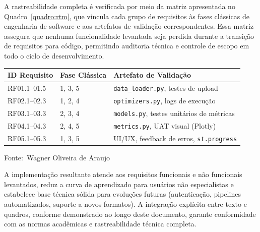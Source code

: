 \documentclass[12pt,a4paper]{article}
\newcommand{\oautor}{Wagner Oliveira de Araujo}
\begin{document}
A rastreabilidade completa é verificada por meio da matriz apresentada no Quadro~\ref{quadro:rtm}, que vincula cada grupo de requisitos às fases clássicas de engenharia de software e aos artefatos de validação correspondentes. Essa matriz assegura que nenhuma funcionalidade levantada seja perdida durante a transição de requisitos para código, permitindo auditoria técnica e controle de escopo em todo o ciclo de desenvolvimento.

\begin{quadro}[ht]
\centering
\small
\caption{Matriz de rastreabilidade de requisitos (\textit{Requirements Traceability Matrix} - RTM)}
\label{quadro:rtm}
\begin{threeparttable}
\begin{tabularx}{\textwidth}{|l|l|X|} \hline
\textbf{ID Requisito} & \textbf{Fase Clássica} & \textbf{Artefato de Validação} \\ \hline
RF01.1--01.5 & 1, 3, 5 & \texttt{data\_loader.py}, testes de upload \\ \hline
RF02.1--02.3 & 1, 2, 4 & \texttt{optimizers.py}, logs de execução \\ \hline
RF03.1--03.3 & 2, 3, 4 & \texttt{models.py}, testes unitários de métricas \\ \hline
RF04.1--04.3 & 2, 4, 5 & \texttt{metrics.py}, UAT visual (Plotly) \\ \hline
RF05.1--05.3 & 1, 3, 5 & UI/UX, feedback de erros, \texttt{st.progress} \\ \hline
\end{tabularx}
\begin{tablenotes}[flushleft]
\footnotesize
\item Fonte:~\oautor
\end{tablenotes}
\end{threeparttable}
\end{quadro}

A implementação resultante atende aos requisitos funcionais e não funcionais levantados, reduz a curva de aprendizado para usuários não especialistas e estabelece base técnica sólida para evoluções futuras (autenticação, pipelines automatizados, suporte a novos formatos). A integração explícita entre texto e quadros, conforme demonstrado ao longo deste documento, garante conformidade com as normas acadêmicas e rastreabilidade técnica completa.
\end{document}
